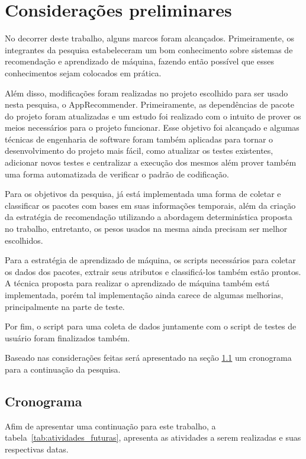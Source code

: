 \chapter[Considerações preliminares]{Considerações preliminares}

No decorrer deste trabalho, alguns marcos foram alcançados. Primeiramente, os
integrantes da pesquisa estabeleceram um bom conhecimento sobre sistemas de
recomendação e aprendizado de máquina, fazendo então possível que esses
conhecimentos sejam colocados em prática.

Além disso, modificações foram realizadas no projeto escolhido para ser usado
nesta pesquisa, o AppRecommender. Primeiramente, as dependências de pacote do
projeto foram atualizadas e um estudo foi realizado com o intuito de prover os
meios necessários para o projeto funcionar. Esse objetivo foi alcançado e
algumas técnicas de engenharia de software foram também aplicadas para tornar o
desenvolvimento do projeto mais fácil, como atualizar os testes existentes, adicionar novos testes
e centralizar a execução dos mesmos além prover também uma forma automatizada de
verificar o padrão de codificação.

Para os objetivos da pesquisa, já está implementada uma forma de coletar e
classificar os pacotes com bases em suas informações temporais, além da criação
da estratégia de recomendação utilizando a abordagem determinística proposta no
trabalho, entretanto, os pesos usados na mesma ainda precisam ser melhor escolhidos.

Para a estratégia de aprendizado de máquina, os scripts necessários para coletar
os dados dos pacotes, extrair seus atributos e classificá-los também estão
prontos. A técnica proposta para realizar o aprendizado de máquina também está
implementada, porém tal implementação ainda carece de algumas melhorias,
principalmente na parte de teste.

Por fim, o script para uma coleta de dados juntamente com o script de testes de
usuário foram finalizados também.

Baseado nas considerações feitas será apresentado na seção \ref{sec:cronagrama} um cronograma
para a continuação da pesquisa.

\section{Cronograma} \label{sec:cronagrama}

Afim de apresentar uma continuação para este trabalho, a tabela~\ref{tab:atividades_futuras},
apresenta as atividades a serem realizadas e suas respectivas datas.

